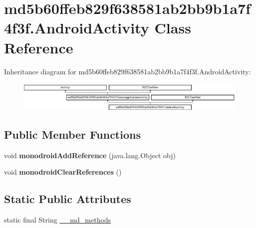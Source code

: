 \hypertarget{classmd5b60ffeb829f638581ab2bb9b1a7f4f3f_1_1AndroidActivity}{}\section{md5b60ffeb829f638581ab2bb9b1a7f4f3f.\+Android\+Activity Class Reference}
\label{classmd5b60ffeb829f638581ab2bb9b1a7f4f3f_1_1AndroidActivity}
Inheritance diagram for md5b60ffeb829f638581ab2bb9b1a7f4f3f.\+Android\+Activity\+:\begin{figure}[H]
\begin{center}
\leavevmode
\includegraphics[height=1.424936cm]{classmd5b60ffeb829f638581ab2bb9b1a7f4f3f_1_1AndroidActivity}
\end{center}
\end{figure}
\subsection*{Public Member Functions}
\begin{DoxyCompactItemize}
\item 
\mbox{\label{classmd5b60ffeb829f638581ab2bb9b1a7f4f3f_1_1AndroidActivity_a6b88d0d1ad864a4599f8a26deaacb459}} 
void {\bfseries monodroid\+Add\+Reference} (java.\+lang.\+Object obj)
\item 
\mbox{\label{classmd5b60ffeb829f638581ab2bb9b1a7f4f3f_1_1AndroidActivity_a5b7d4be6ba547abcf4a46221f65a8eb6}} 
void {\bfseries monodroid\+Clear\+References} ()
\end{DoxyCompactItemize}
\subsection*{Static Public Attributes}
\begin{DoxyCompactItemize}
\item 
static final String \hyperlink{classmd5b60ffeb829f638581ab2bb9b1a7f4f3f_1_1AndroidActivity_a96cef65bd666995b23bcd03497dea337}{\+\_\+\+\_\+md\+\_\+methods}
\end{DoxyCompactItemize}
